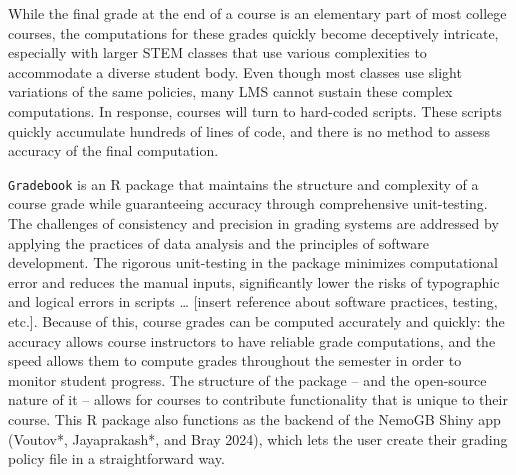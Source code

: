 \documentclass[10pt,a4paper,onecolumn]{article}
\begin{document}
While the final grade at the end of a course is an elementary part of
most college courses, the computations for these grades quickly become
deceptively intricate, especially with larger STEM classes that use
various complexities to accommodate a diverse student body. Even though
most classes use slight variations of the same policies, many LMS cannot
sustain these complex computations. In response, courses will turn to
hard-coded scripts. These scripts quickly accumulate hundreds of lines
of code, and there is no method to assess accuracy of the final
computation.

\texttt{Gradebook} is an R package that maintains the structure and
complexity of a course grade while guaranteeing accuracy through
comprehensive unit-testing. The challenges of consistency and precision
in grading systems are addressed by applying the practices of data
analysis and the principles of software development. The rigorous
unit-testing in the package minimizes computational error and reduces
the manual inputs, significantly lower the risks of typographic and
logical errors in scripts \ldots{} {[}insert reference about software
practices, testing, etc.{]}. Because of this, course grades can be
computed accurately and quickly: the accuracy allows course instructors
to have reliable grade computations, and the speed allows them to
compute grades throughout the semester in order to monitor student
progress. The structure of the package -- and the open-source nature of
it -- allows for courses to contribute functionality that is unique to
their course. This R package also functions as the backend of the NemoGB
Shiny app (Voutov*, Jayaprakash*, and Bray 2024), which lets the user
create their grading policy file in a straightforward way.
\end{document}
